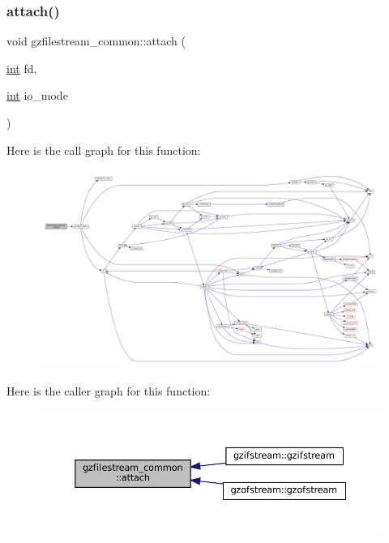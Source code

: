 \subsubsection{\texorpdfstring{attach()}{attach()}}
{\footnotesize\ttfamily void gzfilestream\+\_\+common\+::attach (\begin{DoxyParamCaption}\item[{\mbox{\hyperlink{ioapi_8h_a787fa3cf048117ba7123753c1e74fcd6}{int}}}]{fd,  }\item[{\mbox{\hyperlink{ioapi_8h_a787fa3cf048117ba7123753c1e74fcd6}{int}}}]{io\+\_\+mode }\end{DoxyParamCaption})}

Here is the call graph for this function\+:
\nopagebreak
\begin{figure}[H]
\begin{center}
\leavevmode
\includegraphics[width=350pt]{classgzfilestream__common_a5d89983a0a4842ac15dddc7927031d7e_cgraph}
\end{center}
\end{figure}
Here is the caller graph for this function\+:
\nopagebreak
\begin{figure}[H]
\begin{center}
\leavevmode
\includegraphics[width=350pt]{classgzfilestream__common_a5d89983a0a4842ac15dddc7927031d7e_icgraph}
\end{center}
\end{figure}
\mbox{\label{classgzfilestream__common_a87aa2bfaf8876e1d63edafb7515aaf5f}} 
